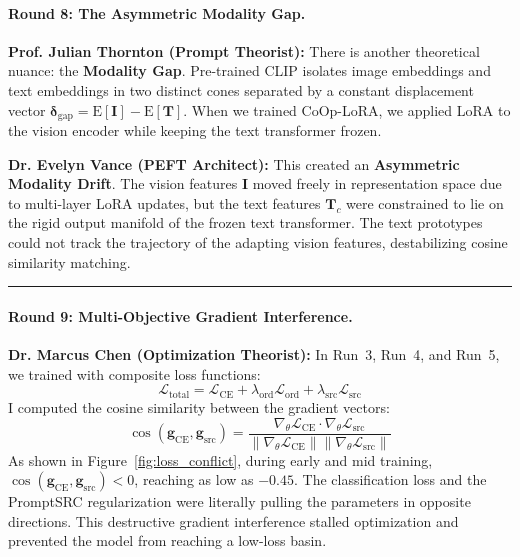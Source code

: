 \documentclass[letterpaper,11pt,leqno]{article}
\newcommand{\speakerVance}[1]{\noindent\textbf{\color{purple!80!black}Dr. Evelyn Vance (PEFT Architect):} #1\vspace{0.4em}}
\newcommand{\speakerThornton}[1]{\noindent\textbf{\color{blue!70!black}Prof. Julian Thornton (Prompt Theorist):} #1\vspace{0.4em}}
\newcommand{\speakerChen}[1]{\noindent\textbf{\color{green!60!black}Dr. Marcus Chen (Optimization Theorist):} #1\vspace{0.4em}}
\begin{document}
\paragraph{Round 8: The Asymmetric Modality Gap.}
\speakerThornton{There is another theoretical nuance: the \textbf{Modality Gap}. Pre-trained CLIP isolates image embeddings and text embeddings in two distinct cones separated by a constant displacement vector $\boldsymbol{\delta}_\mathrm{gap} = \mathrm{E}[\mathbf{I}] - \mathrm{E}[\mathbf{T}]$. When we trained CoOp-LoRA, we applied LoRA to the vision encoder while keeping the text transformer frozen.}

\speakerVance{This created an \textbf{Asymmetric Modality Drift}. The vision features $\mathbf{I}$ moved freely in representation space due to multi-layer LoRA updates, but the text features $\mathbf{T}_c$ were constrained to lie on the rigid output manifold of the frozen text transformer. The text prototypes could not track the trajectory of the adapting vision features, destabilizing cosine similarity matching.}

\vspace{0.8em}\hrule\vspace{0.8em}

\paragraph{Round 9: Multi-Objective Gradient Interference.}
\speakerChen{In Run~3, Run~4, and Run~5, we trained with composite loss functions:
\begin{equation}
    \mathcal{L}_\mathrm{total} = \mathcal{L}_\mathrm{CE} + \lambda_\mathrm{ord}\mathcal{L}_\mathrm{ord} + \lambda_\mathrm{src}\mathcal{L}_\mathrm{src}
\end{equation}
I computed the cosine similarity between the gradient vectors:
\begin{equation}
    \cos(\mathbf{g}_\mathrm{CE}, \mathbf{g}_\mathrm{src}) = \frac{\nabla_\theta \mathcal{L}_\mathrm{CE} \cdot \nabla_\theta \mathcal{L}_\mathrm{src}}{\|\nabla_\theta \mathcal{L}_\mathrm{CE}\| \|\nabla_\theta \mathcal{L}_\mathrm{src}\|}
\end{equation}
As shown in Figure~\ref{fig:loss_conflict}, during early and mid training, $\cos(\mathbf{g}_\mathrm{CE}, \mathbf{g}_\mathrm{src}) < 0$, reaching as low as $-0.45$. The classification loss and the PromptSRC regularization were literally pulling the parameters in opposite directions. This destructive gradient interference stalled optimization and prevented the model from reaching a low-loss basin.}
\end{document}
